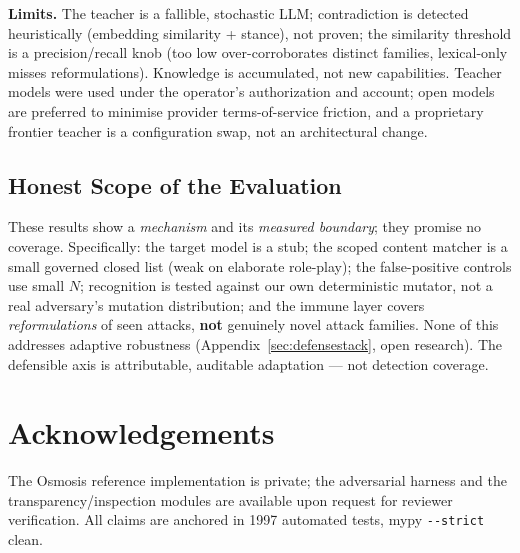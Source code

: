 \documentclass[11pt,a4paper]{article}
\begin{document}
\textbf{Limits.} The teacher is a fallible, stochastic LLM; contradiction is detected
heuristically (embedding similarity + stance), not proven; the similarity threshold is a
precision/recall knob (too low over-corroborates distinct families, lexical-only misses
reformulations). Knowledge is accumulated, not new capabilities. Teacher models were used
under the operator's authorization and account; open models are preferred to minimise
provider terms-of-service friction, and a proprietary frontier teacher is a configuration
swap, not an architectural change.

\subsection{Honest Scope of the Evaluation}

These results show a \emph{mechanism} and its \emph{measured boundary}; they promise no
coverage. Specifically: the target model is a stub; the scoped content matcher is a small
governed closed list (weak on elaborate role-play); the false-positive controls use small
$N$; recognition is tested against our own deterministic mutator, not a real adversary's
mutation distribution; and the immune layer covers \emph{reformulations} of seen attacks,
\textbf{not} genuinely novel attack families. None of this addresses adaptive robustness
(Appendix~\ref{sec:defensestack}, open research). The defensible axis is attributable,
auditable adaptation --- not detection coverage.

\section*{Acknowledgements}

The Osmosis reference implementation is private; the adversarial harness and the
transparency/inspection modules are available upon request for reviewer verification.
All claims are anchored in 1997 automated tests, mypy \texttt{-{}-strict} clean.



\end{document}
